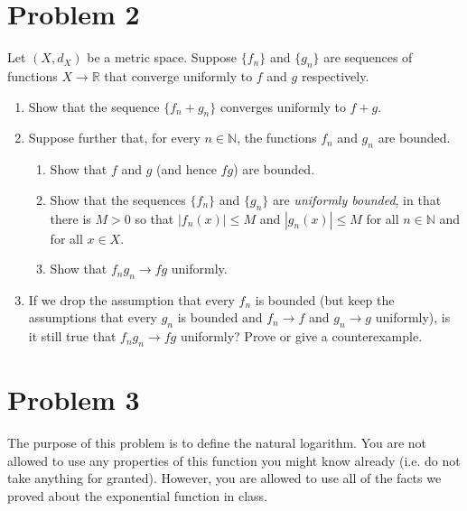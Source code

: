 \documentclass[11pt]{article}
\begin{document}
\pagebreak
\section{Problem 2}
    Let $(X, d_X)$ be a metric space. Suppose $\{f_n\}$ and $\{g_n\}$ are sequences of functions $X \to \mathbb{R}$ that converge uniformly to $f$ and $g$ respectively.
    \begin{enumerate}[label=(\alph*)]
        \item 
        Show that the sequence $\{f_n + g_n\}$ converges uniformly to $f + g$.

        \item 
        Suppose further that, for every $n \in \mathbb{N}$, the functions $f_n$ and $g_n$ are bounded.
        \begin{enumerate}
            \item 
            Show that $f$ and $g$ (and hence $fg$) are bounded.
        
            \item 
            Show that the sequences $\{f_n\}$ and $\{g_n\}$ are \textit{uniformly bounded}, in that there is $M > 0$ so that $|f_n(x)| \leq M$ and $|g_n(x)| \leq M$ for all $n \in \mathbb{N}$ and for all $x \in X$.

            \item 
            Show that $f_ng_n \to fg$ uniformly.

        \end{enumerate}

        \item 
        If we drop the assumption that every $f_n$ is bounded (but keep the assumptions that every $g_n$ is bounded and $f_n \to f$ and $g_n \to g$ uniformly), is it still true that $f_ng_n \to fg$ uniformly? Prove or give a counterexample.
            
    \end{enumerate}

\section{Problem 3}
    The purpose of this problem is to define the natural logarithm. You are not allowed to use any properties of this function you might know already (i.e. do not take anything for granted). However, you are allowed to use all of the facts we proved about the exponential function in class.
    
\end{document}
